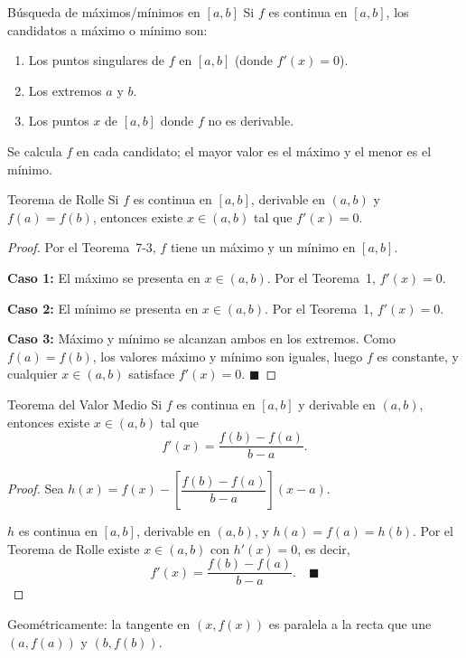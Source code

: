 \documentclass[12pt]{article}
\begin{document}
\begin{nota}[]{Búsqueda de máximos/mínimos en $[a,b]$}
Si $f$ es continua en $[a,b]$, los candidatos a máximo o mínimo son:
\begin{enumerate}
  \item Los puntos singulares de $f$ en $[a, b]$ (donde $f'(x) = 0$).
  \item Los extremos $a$ y $b$.
  \item Los puntos $x$ de $[a, b]$ donde $f$ no es derivable.
\end{enumerate}
Se calcula $f$ en cada candidato; el mayor valor es el máximo y el menor es el mínimo.
\end{nota}

\begin{teorema}[3]{Teorema de Rolle}
Si $f$ es continua en $[a, b]$, derivable en $(a, b)$ y $f(a) = f(b)$, entonces existe $x \in (a, b)$ tal que $f'(x) = 0$.
\end{teorema}

\begin{proof}
Por el Teorema~7-3, $f$ tiene un máximo y un mínimo en $[a,b]$.

\textbf{Caso 1:} El máximo se presenta en $x \in (a,b)$. Por el Teorema~1, $f'(x)=0$.

\textbf{Caso 2:} El mínimo se presenta en $x \in (a,b)$. Por el Teorema~1, $f'(x)=0$.

\textbf{Caso 3:} Máximo y mínimo se alcanzan ambos en los extremos. Como $f(a)=f(b)$, los valores máximo y mínimo son iguales, luego $f$ es constante, y cualquier $x \in (a,b)$ satisface $f'(x)=0$.
$\blacksquare$
\end{proof}

\begin{teorema}[4]{Teorema del Valor Medio}
Si $f$ es continua en $[a, b]$ y derivable en $(a, b)$, entonces existe $x \in (a, b)$ tal que
\[ f'(x) = \frac{f(b) - f(a)}{b - a}. \]
\end{teorema}

\begin{proof}
Sea $h(x) = f(x) - \left[\dfrac{f(b)-f(a)}{b-a}\right](x-a)$.

$h$ es continua en $[a,b]$, derivable en $(a,b)$, y $h(a) = f(a) = h(b)$. Por el Teorema de Rolle existe $x\in(a,b)$ con $h'(x)=0$, es decir,
\[ f'(x) = \frac{f(b)-f(a)}{b-a}. \quad \blacksquare \]
\end{proof}

\begin{nota}[]{}
Geométricamente: la tangente en $(x, f(x))$ es paralela a la recta que une $(a, f(a))$ y $(b, f(b))$.
\end{nota}
\end{document}
